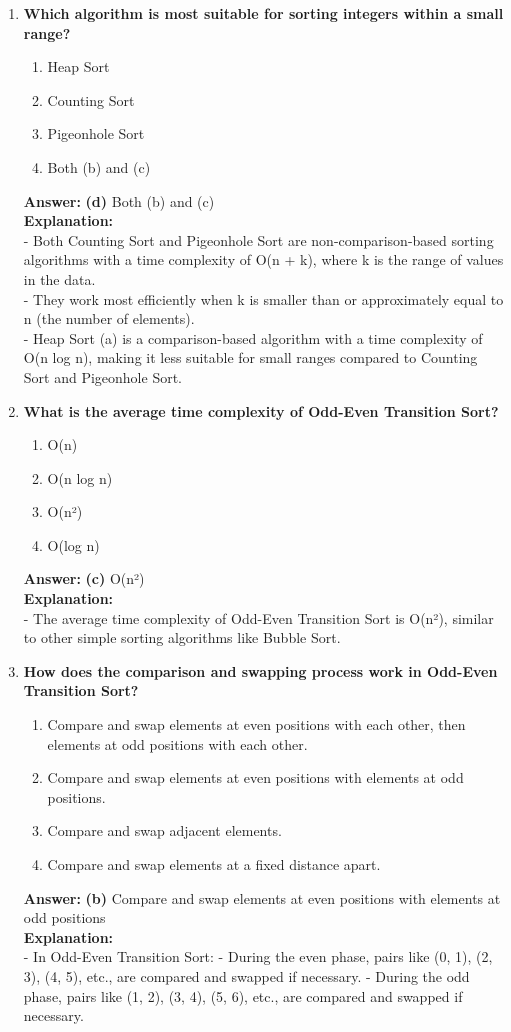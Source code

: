 \begin{enumerate}
    \item \textbf{Which algorithm is most suitable for sorting integers within a small range?}
    \begin{enumerate}
        \item Heap Sort
        \item Counting Sort
        \item Pigeonhole Sort
        \item Both (b) and (c)
    \end{enumerate}
    \textbf{Answer:} \textbf{(d)} Both (b) and (c) \\
    \textbf{Explanation:} \\
    - Both Counting Sort and Pigeonhole Sort are non-comparison-based sorting algorithms with a time complexity of O(n + k), where k is the range of values in the data. \\
    - They work most efficiently when k is smaller than or approximately equal to n (the number of elements). \\
    - Heap Sort (a) is a comparison-based algorithm with a time complexity of O(n log n), making it less suitable for small ranges compared to Counting Sort and Pigeonhole Sort.
    \item \textbf{What is the average time complexity of Odd-Even Transition Sort?}
    \begin{enumerate}
        \item O(n)
        \item O(n log n)
        \item O(n²)
        \item O(log n)
    \end{enumerate}
    \textbf{Answer:} \textbf{(c)} O(n²) \\
    \textbf{Explanation:} \\
    - The average time complexity of Odd-Even Transition Sort is O(n²), similar to other simple sorting algorithms like Bubble Sort.

    \item \textbf{How does the comparison and swapping process work in Odd-Even Transition Sort?}
    \begin{enumerate}
        \item Compare and swap elements at even positions with each other, then elements at odd positions with each other.
        \item Compare and swap elements at even positions with elements at odd positions.
        \item Compare and swap adjacent elements.
        \item Compare and swap elements at a fixed distance apart.
    \end{enumerate}
    \textbf{Answer:} \textbf{(b)} Compare and swap elements at even positions with elements at odd positions \\
    \textbf{Explanation:} \\
    - In Odd-Even Transition Sort:
        - During the even phase, pairs like (0, 1), (2, 3), (4, 5), etc., are compared and swapped if necessary.
        - During the odd phase, pairs like (1, 2), (3, 4), (5, 6), etc., are compared and swapped if necessary.


\end{enumerate}
